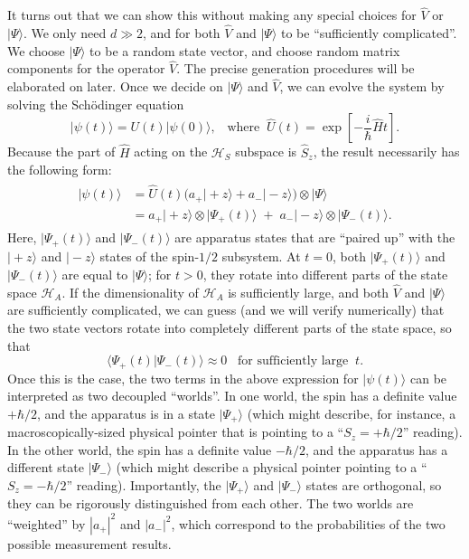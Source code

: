 \documentclass[pra,12pt]{revtex4}
\begin{document}
It turns out that we can show this without making any special choices
for $\hat{V}$ or $|\Psi\rangle$.  We only need $d \gg 2$, and for both
$\hat{V}$ and $|\Psi\rangle$ to be ``sufficiently complicated''.  We
choose $|\Psi\rangle$ to be a random state vector, and choose random
matrix components for the operator $\hat{V}$.  The precise generation
procedures will be elaborated on later.  Once we decide on
$|\Psi\rangle$ and $\hat{V}$, we can evolve the system by solving the
Sch\"odinger equation
\begin{equation}
  |\psi(t)\rangle = U(t)|\psi(0)\rangle, \;\;\;\mathrm{where}\;\; \hat{U}(t) = \exp\left[-\frac{i}{\hbar}\hat{H}t\right].
\end{equation}
Because the part of $\hat{H}$ acting on the $\mathscr{H}_S$ subspace
is $\hat{S}_z$, the result necessarily has the following form:
\begin{align}
  \begin{aligned}|\psi(t)\rangle &= \hat{U}(t)\Big(a_+ |\!+\!z\rangle + a_- |\!-\!z\rangle\Big) \otimes |\Psi\rangle \\ &= a_+ |\!+\!z\rangle \otimes |\Psi_+(t)\rangle \;+\; a_- |\!-\!z\rangle \otimes |\Psi_-(t)\rangle. \end{aligned}
\end{align}
Here, $|\Psi_+(t)\rangle$ and $|\Psi_-(t)\rangle$ are apparatus states
that are ``paired up'' with the $|\!+\!z\rangle$ and $|\!-\!z\rangle$
states of the spin-$1/2$ subsystem.  At $t=0$, both
$|\Psi_+(t)\rangle$ and $|\Psi_-(t)\rangle$ are equal to
$|\Psi\rangle$; for $t > 0$, they rotate into different parts of the
state space $\mathscr{H}_A$.  If the dimensionality of $\mathscr{H}_A$
is sufficiently large, and both $\hat{V}$ and $|\Psi\rangle$ are
sufficiently complicated, we can guess (and we will verify numerically) that
the two state vectors rotate into completely different parts of
the state space, so that
\begin{equation}
  \langle\Psi_+(t) | \Psi_-(t)\rangle \approx 0 \;\;\;\textrm{for sufficiently large}\;\; t.
\end{equation}
Once this is the case, the two terms in the above expression for
$|\psi(t)\rangle$ can be interpreted as two decoupled ``worlds''.  In
one world, the spin has a definite value $+\hbar/2$, and the apparatus
is in a state $|\Psi_+\rangle$ (which might describe, for instance, a
macroscopically-sized physical pointer that is pointing to a ``$S_z =
+\hbar/2$'' reading).  In the other world, the spin has a definite
value $-\hbar/2$, and the apparatus has a different state
$|\Psi_-\rangle$ (which might describe a physical pointer pointing to
a ``$S_z = -\hbar/2$'' reading).  Importantly, the $|\Psi_+\rangle$
and $|\Psi_-\rangle$ states are orthogonal, so they can be rigorously
distinguished from each other.  The two worlds are
``weighted'' by $|a_+|^2$ and $|a_-|^2$, which correspond to the
probabilities of the two possible measurement results.
\end{document}
